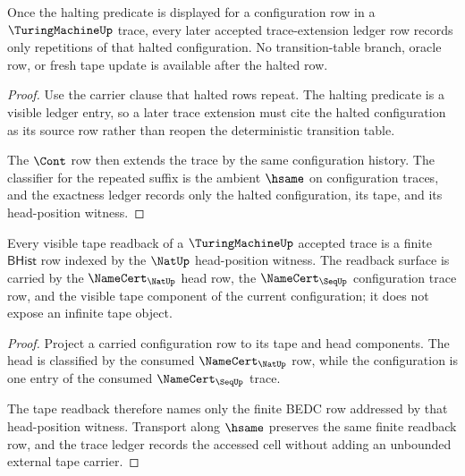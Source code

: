 \begin{theorem}
\label{thm:turingmachine-halted-repetition-ledger-exactness}
Once the halting predicate is displayed for a configuration row in a
$\TuringMachineUp$ trace, every later accepted trace-extension ledger row records
only repetitions of that halted configuration. No transition-table branch,
oracle row, or fresh tape update is available after the halted row.
\end{theorem}
\begin{proof}
Use the carrier clause that halted rows repeat. The halting predicate is a
visible ledger entry, so a later trace extension must cite the halted
configuration as its source row rather than reopen the deterministic transition
table.

The $\Cont$ row then extends the trace by the same configuration history. The
classifier for the repeated suffix is the ambient $\hsame$ on configuration
traces, and the exactness ledger records only the halted configuration, its tape,
and its head-position witness.
\end{proof}

\begin{theorem}
\label{thm:turingmachine-finite-tape-readback-carrier}
Every visible tape readback of a $\TuringMachineUp$ accepted trace is a finite
$\mathsf{BHist}$ row indexed by the $\NatUp$ head-position witness. The readback
surface is carried by the $\NameCert_{\NatUp}$ head row, the
$\NameCert_{\SeqUp}$ configuration trace row, and the visible tape component of
the current configuration; it does not expose an infinite tape object.
\end{theorem}
\begin{proof}
Project a carried configuration row to its tape and head components. The head is
classified by the consumed $\NameCert_{\NatUp}$ row, while the configuration is
one entry of the consumed $\NameCert_{\SeqUp}$ trace.

The tape readback therefore names only the finite BEDC row addressed by that
head-position witness. Transport along $\hsame$ preserves the same finite
readback row, and the trace ledger records the accessed cell without adding an
unbounded external tape carrier.
\end{proof}

